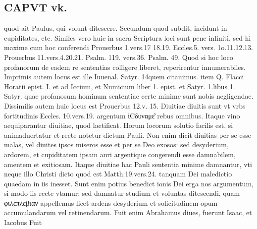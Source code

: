 \documentclass{article}
\begin{document}
\begin{pages}
\section*{CAPVT  vk. }
\marginpar{[ p.443 ]}\pstart quod ait Paulus, qui volunt ditescere. Secundum quod subdit, incidunt in cupiditates, etc.  \pend\pstart Similes vero huic in sacra Scriptura loci sunt pene infiniti, sed hi maxime cum hoc conferendi Prouerbus 1.vers.17 18.19. Eccles.5. vers. 1o.11.12.13. Prouerbus 11.vers.4.20.21. Psalm. 119. vers.36. Psalm. 49. Quod si hoc loco profanorum de eadem re sententias colligere liberet, reperirentur innumerabiles. Imprimis autem locus est ille Iuuenal. Satyr. 14quem citauimus. item Q. Flacci Horatii epist. I. et ad Iccium, et Numicium liber 1. epist. et Satyr. 1.libus 1. Satyr. quae profanosum hominum sententiae certe minime sunt nobis negligendae.  \pend\pstart Dissimilis autem huic locus est Prouerbus 12.v. 15. Diuitiae diuitis sunt vt vrbs fortitudinis Eccles. 10.vers.19. argentum ἱCδυναμε͂ rebus omnibus. Itaque vino aequiparantur diuitiae, quod laetificat.  \pend\pstart Horum locorum solutio facilis est, si animaduertatur et recte notetur dictum Pauli. Non enim dicit diuitias per se esse malas, vel diuites ipsos miseros esse et per se Deo exosos: sed desyderium, ardorem, et cupiditatem ipsam auri argentique congerendi esse damnabilem, amentem et exitiosam. Itaque diuitiae hac Pauli sententia minime damnantur, vti neque illo Christi dicto quod est Matth.19.vers.24. tanquam Dei maledictio quaedam in iis inesset. Sunt enim potius benedict ionis Dei erga nos argumentum, si modo iis recte vtamur: sed damnatur studium et voluntas ditescendi, quam φιλεπλεβιαν appellemus licet ardens desyderium et solicitudinem opum accumulandarum vel retinendarum. Fuit enim Abrahamus diues, fuerunt Isaac, et Iacobus  Fuit  \pend

\end{pages}
\end{document}
